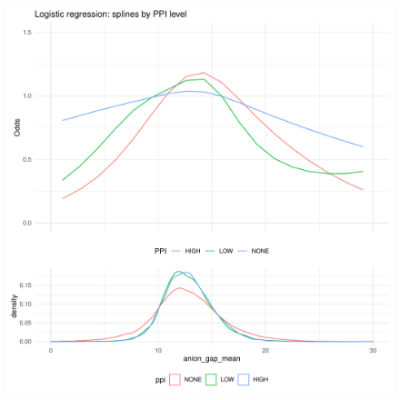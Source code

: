 \documentclass[english]{article}
\begin{document}
\begin{figure}[h]
\centering
\includegraphics[width=\linewidth]{labs/logreg_splines_ppi_x_anion_gap.pdf}
\end{figure}
\end{document}
